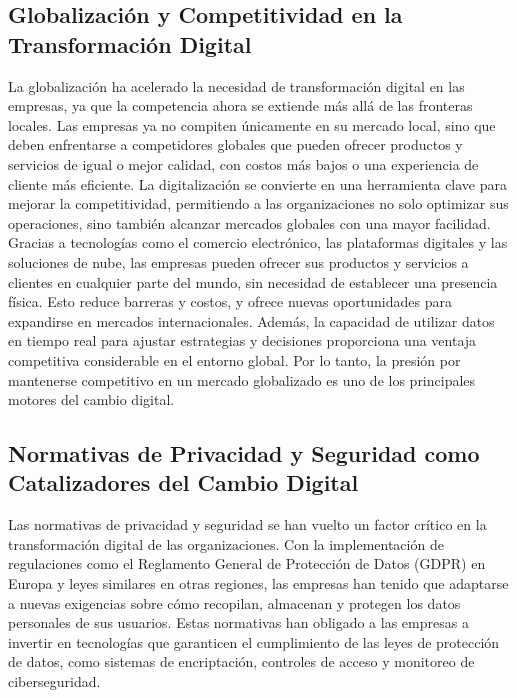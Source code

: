\documentclass{article}
\begin{document}
\subsection{Globalización y Competitividad en la Transformación Digital}
La globalización ha acelerado la necesidad de transformación digital en las empresas, ya que la competencia ahora se extiende más allá de las fronteras locales. Las empresas ya no compiten únicamente en su mercado local, sino que deben enfrentarse a competidores globales que pueden ofrecer productos y servicios de igual o mejor calidad, con costos más bajos o una experiencia de cliente más eficiente. La digitalización se convierte en una herramienta clave para mejorar la competitividad, permitiendo a las organizaciones no solo optimizar sus operaciones, sino también alcanzar mercados globales con una mayor facilidad.\\

Gracias a tecnologías como el comercio electrónico, las plataformas digitales y las soluciones de nube, las empresas pueden ofrecer sus productos y servicios a clientes en cualquier parte del mundo, sin necesidad de establecer una presencia física. Esto reduce barreras y costos, y ofrece nuevas oportunidades para expandirse en mercados internacionales. Además, la capacidad de utilizar datos en tiempo real para ajustar estrategias y decisiones proporciona una ventaja competitiva considerable en el entorno global. Por lo tanto, la presión por mantenerse competitivo en un mercado globalizado es uno de los principales motores del cambio digital.\\

\subsection{Normativas de Privacidad y Seguridad como Catalizadores del Cambio Digital}
Las normativas de privacidad y seguridad se han vuelto un factor crítico en la transformación digital de las organizaciones. Con la implementación de regulaciones como el Reglamento General de Protección de Datos (GDPR) en Europa y leyes similares en otras regiones, las empresas han tenido que adaptarse a nuevas exigencias sobre cómo recopilan, almacenan y protegen los datos personales de sus usuarios. Estas normativas han obligado a las empresas a invertir en tecnologías que garanticen el cumplimiento de las leyes de protección de datos, como sistemas de encriptación, controles de acceso y monitoreo de ciberseguridad.\\
\end{document}
